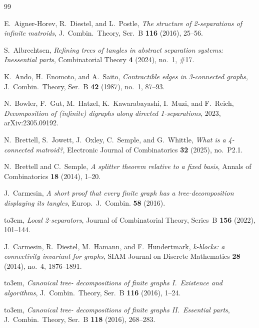 \documentclass{aic}
\theoremstyle{plain}
\theoremstyle{definition}
\theoremstyle{plain}
\theoremstyle{plain}
\begin{document}
\providecommand{\bysame}{\leavevmode\hbox to3em{\hrulefill}\thinspace}

\begin{thebibliography}{99}

E.~Aigner-Horev, R.~Diestel, and L.~Postle, \emph{The structure of
  2-separations of infinite matroids}, J.~Combin.\ Theory, Ser.~B \textbf{116}
  (2016), 25--56.

S.~Albrechtsen, \emph{Refining trees of tangles in abstract separation systems:
  {I}nessential parts}, Combinatorial Theory \textbf{4} (2024), no.~1, {\#}17.

K.~Ando, H.~Enomoto, and A.~Saito, \emph{Contractible edges in 3-connected
  graphs}, J.~Combin.\ Theory, Ser.~B \textbf{42} (1987), no.~1, 87--93.

N.~Bowler, F.~Gut, M.~Hatzel, K.~Kawarabayashi, I.~Muzi, and F.~Reich,
  \emph{Decomposition of (infinite) digraphs along directed 1-separations},
  2023, arXiv:2305.09192.

N.~Brettell, S.~Jowett, J.~Oxley, C.~Semple, and G.~Whittle, \emph{What is a
  4-connected matroid?}, Electronic Journal of Combinatorics \textbf{32}
  (2025), no.~P2.1.

N.~Brettell and C.~Semple, \emph{A splitter theorem relative to a fixed basis},
  Annals of Combinatorics \textbf{18} (2014), 1--20.

J.~Carmesin, \emph{A short proof that every finite graph has a
  tree-decomposition displaying its tangles}, Europ.\ J.\ Combin. \textbf{58}
  (2016).

\bysame, \emph{Local 2-separators}, Journal of Combinatorial Theory, Series~B
  \textbf{156} (2022), 101--144.

J.~Carmesin, R.~Diestel, M.~Hamann, and F.~Hundertmark, \emph{k-blocks: a
  connectivity invariant for graphs}, SIAM Journal on Discrete Mathematics
  \textbf{28} (2014), no.~4, 1876--1891.

\bysame, \emph{Canonical tree- decompositions of finite graphs
  {I.~Existence} and algorithms}, J.~Combin.\ Theory, Ser.~B \textbf{116}
  (2016), 1--24.

\bysame, \emph{Canonical tree- decompositions of finite graphs
  {II.~Essential} parts}, J.~Combin.\ Theory, Ser.~B \textbf{118} (2016),
  268--283.


\end{thebibliography}
\end{document}
